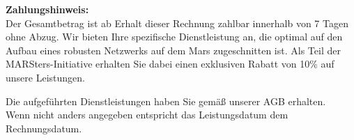 \documentclass[12pt,a4paper]{article}
\begin{document}
\noindent
\begin{minipage}[t]{0.48\textwidth}
\renewcommand{\arraystretch}{1.3}
\begin{tabularx}{\linewidth}{@{}X r@{}}

\end{tabularx}
\end{minipage}
\begin{minipage}[t]{\textwidth}
\small
\textbf{Zahlungshinweis:} \\
Der Gesamtbetrag ist ab Erhalt dieser Rechnung
zahlbar innerhalb von 7 Tagen ohne Abzug.
Wir bieten Ihre spezifische Dienstleistung an, die optimal auf den Aufbau eines robusten Netzwerks auf dem Mars zugeschnitten ist. 
Als Teil der MARSters-Initiative erhalten Sie dabei einen exklusiven Rabatt von 10\% auf unsere Leistungen.
\end{minipage}
\hfill


\vspace{1.5em}
\footnotesize
Die aufgeführten Dienstleistungen haben Sie gemäß unserer AGB erhalten.\\
Wenn nicht anders angegeben entspricht das Leistungsdatum dem Rechnungsdatum.
\end{document}
